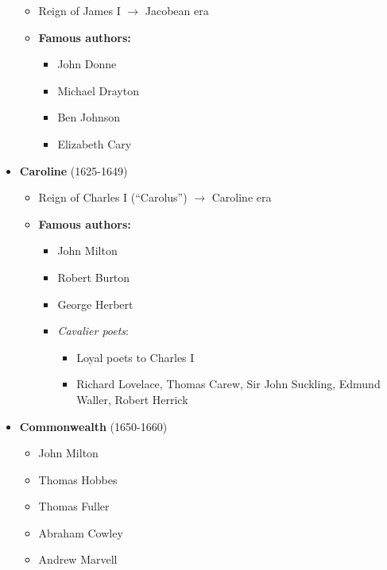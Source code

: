 \documentclass[
  12pt,
    progressbar=frametitle]{beamer}
\providecommand{\tightlist}{%
  \setlength{\itemsep}{0pt}\setlength{\parskip}{0pt}}
\begin{document}
\begin{frame}[allowframebreaks]
\begin{itemize}
  \begin{itemize}
  \tightlist
  \item
    Reign of James I \(\rightarrow\) Jacobean era
  \item
    \textbf{Famous authors:}

    \begin{itemize}
    \tightlist
    \item
      John Donne
    \item
      Michael Drayton
    \item
      Ben Johnson
    \item
      Elizabeth Cary
    \end{itemize}
  \end{itemize}
\item
  \textbf{Caroline} (1625-1649)

  \begin{itemize}
  \tightlist
  \item
    Reign of Charles I (``Carolus'') \(\rightarrow\) Caroline era
  \item
    \textbf{Famous authors:}

    \begin{itemize}
    \tightlist
    \item
      John Milton
    \item
      Robert Burton
    \item
      George Herbert
    \item
      \emph{Cavalier poets}:

      \begin{itemize}
      \tightlist
      \item
        Loyal poets to Charles I
      \item
        Richard Lovelace, Thomas Carew, Sir John Suckling, Edmund
        Waller, Robert Herrick
      \end{itemize}
    \end{itemize}
  \end{itemize}
\item
  \textbf{Commonwealth} (1650-1660)

  \begin{itemize}
  \tightlist
  \item
    John Milton
  \item
    Thomas Hobbes
  \item
    Thomas Fuller
  \item
    Abraham Cowley
  \item
    Andrew Marvell
  \end{itemize}
\end{itemize}
\end{frame}
\end{document}
